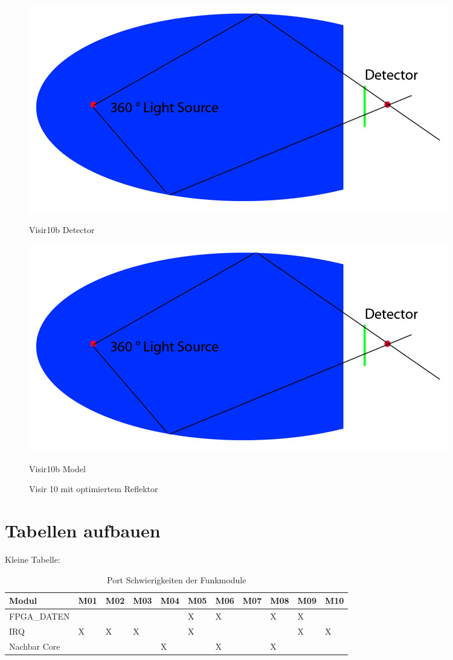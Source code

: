 \begin{figure}[H]
  \centering
  \begin{minipage}[b]{0.45\textwidth}
    \includegraphics[scale=0.15]{images/photoshop/Skizze.jpg}
    \caption{Visir10b Detector}
    \label{Visir10bDetector} 
  \end{minipage} %
  \begin{minipage}[b]{0.45\textwidth}
    \includegraphics[scale=0.15]{images/photoshop/Skizze.jpg} 
    \caption{Visir10b Model}
    \label{Visir10bModel} 
  \end{minipage}
  \caption{Visir 10 mit optimiertem Reflektor}
  \label{fig.Visir10b}
\end{figure}


\section{Tabellen aufbauen}\label{tabelle}
Kleine Tabelle:

\begin{table}[ht] \centering
	\begin{tabular}{|p{3cm}|p{.5cm}|p{.5cm}|p{.5cm}|p{.5cm}|p{.5cm}|p{.5cm}|p{.5cm}|p{.5cm}|p{.5cm}|p{.5cm}|} \hline
		\rowcolor{gray} Modul & M01 & M02 & M03 & M04 & M05 & M06 & M07 & M08 & M09 & M10 \\
		\hline
		FPGA\_DATEN & & & & & X & X & & X & X & \\
		\hline
		IRQ & X & X & X & & X & & & & X & X \\
		\hline
		Nachbar Core & & & & X & & X & & X & & \\
		\hline
	\end{tabular}
	\caption{Port Schwierigkeiten der Funkmodule}
	\label{tab:portprobleme}
 \end{table}	


